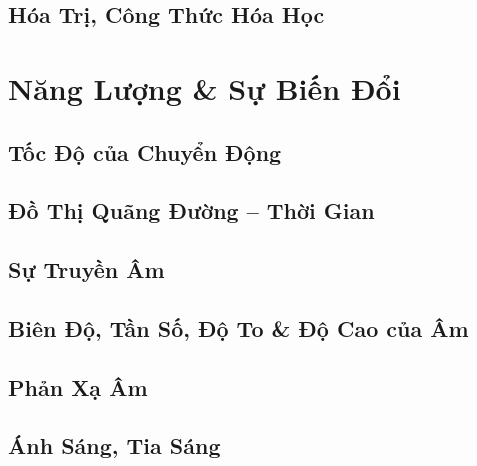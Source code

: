 \documentclass{article}
\numberwithin{equation}{section}
\begin{document}

\subsection{Hóa Trị, Công Thức Hóa Học}


\section{Năng Lượng \& Sự Biến Đổi}

\subsection{Tốc Độ của Chuyển Động}


\subsection{Đồ Thị Quãng Đường -- Thời Gian}


\subsection{Sự Truyền Âm}


\subsection{Biên Độ, Tần Số, Độ To \& Độ Cao của Âm}


\subsection{Phản Xạ Âm}


\subsection{Ánh Sáng, Tia Sáng}
\end{document}
